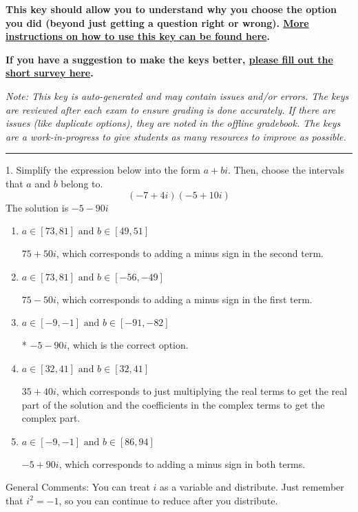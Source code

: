 \documentclass{article}[14pt]
\begin{document}
\textbf{This key should allow you to understand why you choose the option you did (beyond just getting a question right or wrong). \href{https://xronos.clas.ufl.edu/mac1105spring2020/courseDescriptionAndMisc/Exams/LearningFromResults}{More instructions on how to use this key can be found here}.}

\textbf{If you have a suggestion to make the keys better, \href{https://forms.gle/CZkbZmPbC9XALEE88}{please fill out the short survey here}.}

\textit{Note: This key is auto-generated and may contain issues and/or errors. The keys are reviewed after each exam to ensure grading is done accurately. If there are issues (like duplicate options), they are noted in the offline gradebook. The keys are a work-in-progress to give students as many resources to improve as possible.}

\rule{\textwidth}{0.4pt}

1. Simplify the expression below into the form $a+bi$. Then, choose the intervals that $a$ and $b$ belong to.
$$ (-7  + 4 i)(-5  + 10 i) $$ 
The solution is $ -5  - 90 i $ 

\begin{enumerate}[label=\Alph*.] 
\item $ a \in [73, 81] \text{ and } b \in [49, 51] $ 

  $75  + 50 i$, which corresponds to adding a minus sign in the second term. 
\item $ a \in [73, 81] \text{ and } b \in [-56, -49] $ 

  $75  - 50 i$, which corresponds to adding a minus sign in the first term. 
\item $ a \in [-9, -1] \text{ and } b \in [-91, -82] $ 

 * $-5  - 90 i$, which is the correct option. 
\item $ a \in [32, 41] \text{ and } b \in [32, 41] $ 

  $35  + 40 i$, which corresponds to just multiplying the real terms to get the real part of the solution and the coefficients in the complex terms to get the complex part. 
\item $ a \in [-9, -1] \text{ and } b \in [86, 94] $ 

  $-5  + 90 i$, which corresponds to adding a minus sign in both terms. 
\end{enumerate} 
 
General Comments: You can treat $i$ as a variable and distribute. Just remember that $i^2=-1$, so you can continue to reduce after you distribute.
\end{document}
